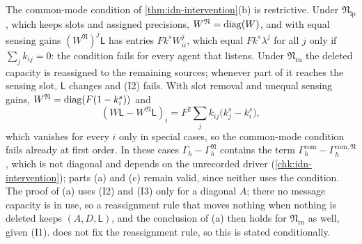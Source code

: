\begin{remark}\label{rem:idn-difference-fails}
The common-mode condition of \cref{thm:idn-intervention}(b) is restrictive. Under $\mathfrak N_{\mathrm{lp}}$, which keeps slots and assigned precisions, $W^{\mathfrak N}=\operatorname{diag}(W)$, and with equal sensing gains $(W^{\mathfrak N})^j\mathsf L$ has entries $Fk^sW_{ii}^j$, which equal $Fk^s\lambda^j$ for all $j$ only if $\sum_jk_{ij}=0$: the condition fails for every agent that listens. Under $\mathfrak N_{\mathrm{rn}}$ the deleted capacity is reassigned to the remaining sources; whenever part of it reaches the sensing slot, $\mathsf L$ changes and (I2) fails. With slot removal and unequal sensing gains, $W^{\mathfrak N}=\operatorname{diag}(F(1-k^s_i))$ and
\begin{equation}\label{eq:idn-unequal}
(W\mathsf L-W^{\mathfrak N}\mathsf L)_i=F^2\sum_jk_{ij}\bigl(k^s_j-k^s_i\bigr),
\end{equation}
which vanishes for every $i$ only in special cases, so the common-mode condition fails already at first order. In these cases $\Gamma_h-\Gamma^{\mathfrak N}_h$ contains the term $\Gamma^{\mathrm{com}}_h-\Gamma^{\mathrm{com},\mathfrak N}_h$, which is not diagonal and depends on the unrecorded driver (\cref{chk:idn-intervention}); parts (a) and (c) remain valid, since neither uses the condition. The proof of (a) uses (I2) and (I3) only for a diagonal $A$; there no message capacity is in use, so a reassignment rule that moves nothing when nothing is deleted keeps $(A,D,\mathsf L)$, and the conclusion of (a) then holds for $\mathfrak N_{\mathrm{rn}}$ as well, given (I1).  does not fix the reassignment rule, so this is stated conditionally.
\end{remark}

